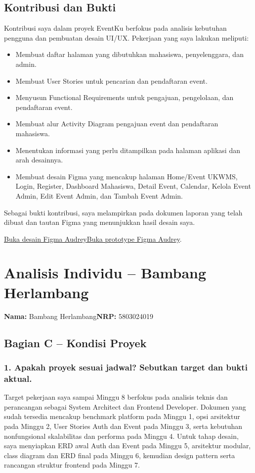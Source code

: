 \documentclass[11pt,a4paper]{article}
\newcommand{\page}[1]{\clearpage\section{#1}}
\begin{document}
\subsection*{Kontribusi dan Bukti}
Kontribusi saya dalam proyek EventKu berfokus pada analisis kebutuhan pengguna dan pembuatan desain UI/UX. Pekerjaan yang saya lakukan meliputi:
\begin{itemize}
\item Membuat daftar halaman yang dibutuhkan mahasiswa, penyelenggara, dan admin.
\item Membuat User Stories untuk pencarian dan pendaftaran event.
\item Menyusun Functional Requirements untuk pengajuan, pengelolaan, dan pendaftaran event.
\item Membuat alur Activity Diagram pengajuan event dan pendaftaran mahasiswa.
\item Menentukan informasi yang perlu ditampilkan pada halaman aplikasi dan arah desainnya.
\item Membuat desain Figma yang mencakup halaman Home/Event UKWMS, Login, Register, Dashboard Mahasiswa, Detail Event, Calendar, Kelola Event Admin, Edit Event Admin, dan Tambah Event Admin.
\end{itemize}

Sebagai bukti kontribusi, saya melampirkan pada dokumen laporan yang telah dibuat dan tautan Figma yang menunjukkan hasil desain saya.

\href{https://www.figma.com/design/msefrhl4aO32NFpVU4MRlo/RPL-EventKu--UTS-?node-id=0-1\&p=f\&t=HvIXZzI2tPTZ8Ou0-0}{Buka desain Figma Audrey}\quad\href{https://www.figma.com/proto/msefrhl4aO32NFpVU4MRlo/RPL-EventKu--UTS-?node-id=1-52\&p=f\&t=HvIXZzI2tPTZ8Ou0-0\&scaling=scale-down-width\&content-scaling=fixed\&page-id=0\%3A1}{Buka prototype Figma Audrey}.

\page{Analisis Individu -- Bambang Herlambang}
\textbf{Nama:} Bambang Herlambang\quad\textbf{NRP:} 5803024019

\subsection*{Bagian C -- Kondisi Proyek}
\subsubsection*{1. Apakah proyek sesuai jadwal? Sebutkan target dan bukti aktual.}
Target pekerjaan saya sampai Minggu 8 berfokus pada analisis teknis dan perancangan sebagai System Architect dan Frontend Developer. Dokumen yang sudah tersedia mencakup benchmark platform pada Minggu 1, opsi arsitektur pada Minggu 2, User Stories Auth dan Event pada Minggu 3, serta kebutuhan nonfungsional skalabilitas dan performa pada Minggu 4. Untuk tahap desain, saya menyiapkan ERD awal Auth dan Event pada Minggu 5, arsitektur modular, class diagram dan ERD final pada Minggu 6, kemudian design pattern serta rancangan struktur frontend pada Minggu 7.
\end{document}
